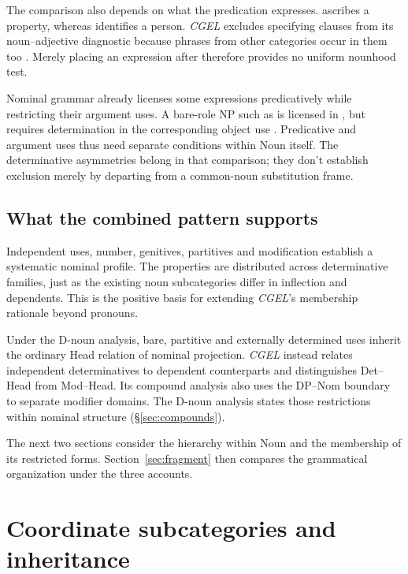 \documentclass[12pt]{article}
\begin{document}
The comparison also depends on what the predication expresses.  ascribes a property, whereas  identifies a person. \textit{CGEL} excludes specifying  clauses from its noun--adjective diagnostic because phrases from other categories occur in them too \citep[536]{huddleston2002}. Merely placing an expression after  therefore provides no uniform nounhood test.

Nominal grammar already licenses some expressions predicatively while restricting their argument uses. A bare-role NP such as  is licensed in , but requires determination in the corresponding object use  \citep[328]{huddleston2002}. Predicative and argument uses thus need separate conditions within Noun itself. The determinative asymmetries belong in that comparison; they don't establish exclusion merely by departing from a common-noun substitution frame.

\subsection{What the combined pattern supports}\label{sec:cumulative}

Independent uses, number, genitives, partitives and modification establish a systematic nominal profile. The properties are distributed across determinative families, just as the existing noun subcategories differ in inflection and dependents. This is the positive basis for extending \textit{CGEL}'s membership rationale beyond pronouns.

Under the D-noun analysis, bare, partitive and externally determined uses inherit the ordinary Head relation of nominal projection. \textit{CGEL} instead relates independent determinatives to dependent counterparts and distinguishes Det--Head from Mod--Head. Its compound analysis also uses the DP--Nom boundary to separate modifier domains. The D-noun analysis states those restrictions within nominal structure (§\ref{sec:compounds}).

The next two sections consider the hierarchy within Noun and the membership of its restricted forms. Section~\ref{sec:fragment} then compares the grammatical organization under the three accounts.

\section{Coordinate subcategories and inheritance}\label{sec:inheritance}
\end{document}

